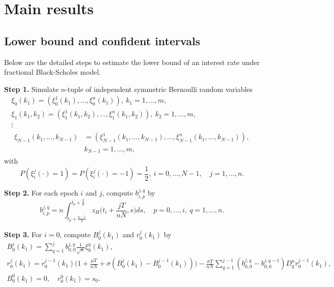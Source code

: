 \documentclass[10pt,a4paper]{amsart}
\numberwithin{equation}{section}
\begin{document}
\section{Main results}
\label{sec:main}

\subsection{Lower bound and confident intervals}
Below are the detailed steps to estimate the lower bound of an interest rate under 
fractional Black-Scholes model.
\smallskip

\noindent\textbf{Step 1.} Simulate $n$-tuple of independent symmetric Bernoulli
 random variables
\begin{gather*}
 \xi_0(k_1)=\left(\xi_0^1(k_1), \dots,
  \xi_0^n(k_1)\right), \ k_1=1,\dots,m,\\
 \xi_1\left(k_1,k_2\right)=\left(\xi_1^1\left(k_1,k_2\right), \dots,
 \xi_1^n\left(k_1,k_2\right)\right), \ k_2=1,\dots,m,\\
 \vdots\\
\begin{aligned}
\xi_{N-1}\left(k_1,\dots,k_{N-1}\right)
&=\left(\xi_{N-1}^1\left(k_1,\dots,k_{N-1}\right), \dots, \xi_{N-1}^n\left(k_1,
\dots,k_{N-1}\right)\right), \\ &k_{N-1}=1,\dots,m,
\end{aligned}
\end{gather*}
with
\[ 
P\left(\xi_i^j\left(\cdot\right)=1\right)
=P\left(\xi_i^j\left(\cdot\right)=-1\right)
=\frac{1}{2},\ i=0,\dots,N-1,\quad  j=1,\dots,n.
\]
\smallskip

\noindent\textbf{Step 2.} For each epoch $i$ and $j$, compute $b_{i,p}^{j,q}$ by
\[
 b_{i,p}^{j,q}=n \int_{t_p+\frac{q-1}{n}}^{t_p+\frac{q}{n}} z_H
  \Big(t_{i}+\frac{jT}{nN}, s\Big) d s,\quad  p=0,\dots,i,\ q=1,\dots,n.
\]
\smallskip

\noindent\textbf{Step 3.} For $i=0$, compute $B_{0}^{j}(k_1)$ and
$r_{0}^{j}(k_1)$ by
\begin{gather*}
 B_{0}^{j}(k_1)
 =\sum_{q=1}^{j} b_{0,0}^{j,q} \frac{1}{\sqrt{n}} \xi_0^q(k_1),\\
 r_{0}^{j}(k_1)
 = r_{0}^{j-1}(k_1)\Big(1+\frac{\mu T}{nN}+\sigma\left(B_{0}^{j}(k_1)-B_{0}^{j-1}(k_1)
 \right)\Big)
 - \frac{\sigma T}{nN} \sum_{q=1}^{j-1}\left(b_{0,0}^{j,q}-b_{0,0}^{j,q-1}\right)
  D_q^n r_{0}^{j-1}(k_1) ,
\\
 B_{0}^{0}(k_1)=0,\quad r_{0}^{0}(k_1)=s_0.
\end{gather*}
\smallskip
\end{document}
